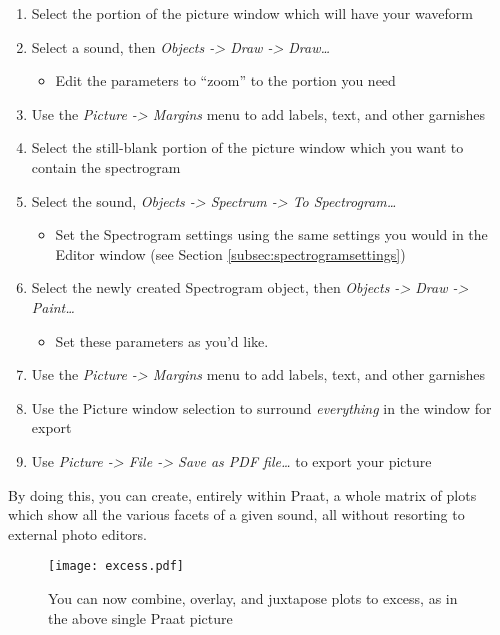 \begin{enumerate}
\def\labelenumi{\arabic{enumi}.}
\tightlist
\item
  Select the portion of the picture window which will have your waveform
\item
  Select a sound, then \emph{Objects -\textgreater{} Draw
  -\textgreater{} Draw\ldots{}}

  \begin{itemize}
  \tightlist
  \item
    Edit the parameters to ``zoom'' to the portion you need
  \end{itemize}
\item
  Use the \emph{Picture -\textgreater{} Margins} menu to add labels,
  text, and other garnishes
\item
  Select the still-blank portion of the picture window which you want to
  contain the spectrogram
\item
  Select the sound, \emph{Objects -\textgreater{} Spectrum
  -\textgreater{} To Spectrogram\ldots{}}

  \begin{itemize}
  \tightlist
  \item
    Set the Spectrogram settings using the same settings you would in
    the Editor window (see Section \ref{subsec:spectrogramsettings})
  \end{itemize}
\item
  Select the newly created Spectrogram object, then \emph{Objects
  -\textgreater{} Draw -\textgreater{} Paint\ldots{}}

  \begin{itemize}
  \tightlist
  \item
    Set these parameters as you'd like.
  \end{itemize}
\item
  Use the \emph{Picture -\textgreater{} Margins} menu to add labels,
  text, and other garnishes
\item
  Use the Picture window selection to surround \emph{everything} in the
  window for export
\item
  Use \emph{Picture -\textgreater{} File -\textgreater{} Save as PDF
  file\ldots{}} to export your picture
\end{enumerate}

By doing this, you can create, entirely within Praat, a whole matrix of
plots which show all the various facets of a given sound, all without
resorting to external photo editors.

\begin{figure}
  \centerline{
    \mbox{\texttt{[image: excess.pdf]}}
  }
  \caption{You can now combine, overlay, and juxtapose plots to excess, as in the above single Praat picture}
  
  \end{figure}

